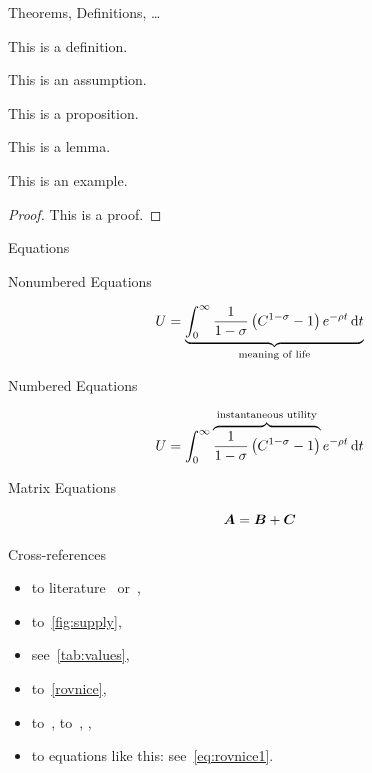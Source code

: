 Theorems, Definitions, \ldots

\begin{defin}\label{de:definice1}
This is a definition.
\end{defin}

\begin{ass}\label{as:predpoklad1}
This is an assumption.
\end{ass}

\begin{prop}\label{pr:veta1}
This is a proposition.
\end{prop}

\begin{lemma}\label{le:lemma1}
This is a lemma.
\end{lemma}

\begin{exam}\label{ex:priklad1}
This is an example.
\end{exam}

\begin{proof}
This is a proof.
\end{proof}

Equations
\label{rovnice}

Nonumbered Equations


    \[ U = \underbrace{\int_0^{\infty} \frac{1}{1-\sigma}\left(C^{1-\sigma} -1 \right) e^{-\rho t} \,\mathrm{d} t}_\text{meaning of life} \]


Numbered Equations

\begin{equation}\label{eq:rovnice1}
    U = \int_0^{\infty} \overbrace{ \frac{1}{1-\sigma}\left(C^{1-\sigma} -1 \right)}^\text{instantaneous utility} e^{-\rho t} \,\mathrm{d} t
\end{equation}

Matrix Equations

\begin{equation}\label{eq:rovnice2}
    \mbox{\boldmath $A$} = \mbox{\boldmath $B$} + \mbox{\boldmath $C$}
\end{equation}

Cross-references

\begin{itemize}
    \item to literature~\citep[pg.~10]{Bjorvatn2006} 	
            or~\citet[pg.~10]{Haufler2006},
    \item to~\autoref{fig:supply},														%
    \item see~\autoref{tab:values},
    \item to~\autoref{rovnice},
    \item to~, to~,
            , 
    \item to equations like this: see~\eqref{eq:rovnice1}.
\end{itemize}

